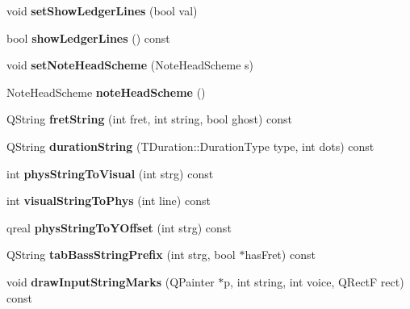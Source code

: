 \begin{DoxyCompactItemize}
void {\bfseries set\+Show\+Ledger\+Lines} (bool val)
\item 
\mbox{\label{class_ms_1_1_staff_type_ad8f3acef61fb2f244f2df3480bff9f8b}} 
bool {\bfseries show\+Ledger\+Lines} () const
\item 
\mbox{\label{class_ms_1_1_staff_type_ad17b325f2d648497603d7e54df1aae32}} 
void {\bfseries set\+Note\+Head\+Scheme} (Note\+Head\+Scheme s)
\item 
\mbox{\label{class_ms_1_1_staff_type_aecbef14293e05e5e51d71a765191edf6}} 
Note\+Head\+Scheme {\bfseries note\+Head\+Scheme} ()
\item 
\mbox{\label{class_ms_1_1_staff_type_a7e44b77a245a1acdd78e3c7c096da4bd}} 
Q\+String {\bfseries fret\+String} (int fret, int string, bool ghost) const
\item 
\mbox{\label{class_ms_1_1_staff_type_aaa492097382ca50b2b5481951be1dd78}} 
Q\+String {\bfseries duration\+String} (T\+Duration\+::\+Duration\+Type type, int dots) const
\item 
\mbox{\label{class_ms_1_1_staff_type_ad6c27f91b390e86ffe8f963db51e64af}} 
int {\bfseries phys\+String\+To\+Visual} (int strg) const
\item 
\mbox{\label{class_ms_1_1_staff_type_ad6bab5f888942df8d30edb024c2b8697}} 
int {\bfseries visual\+String\+To\+Phys} (int line) const
\item 
\mbox{\label{class_ms_1_1_staff_type_a5c8edcd1dcd113c55d1a682cf422c26e}} 
qreal {\bfseries phys\+String\+To\+Y\+Offset} (int strg) const
\item 
\mbox{\label{class_ms_1_1_staff_type_a149b0f10a5a814fb5842ae2bd2473e92}} 
Q\+String {\bfseries tab\+Bass\+String\+Prefix} (int strg, bool $\ast$has\+Fret) const
\item 
\mbox{\label{class_ms_1_1_staff_type_a797854208b40e775d15f64b037a58ad3}} 
void {\bfseries draw\+Input\+String\+Marks} (Q\+Painter $\ast$p, int string, int voice, Q\+RectF rect) const

\end{DoxyCompactItemize}
